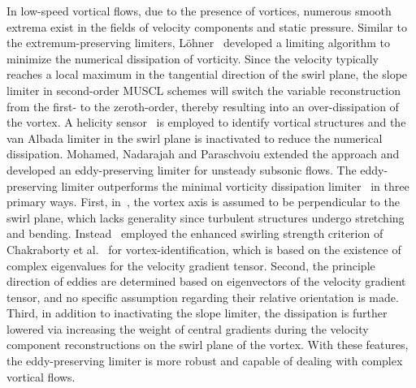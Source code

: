 

In low-speed vortical flows, due to the presence of vortices, numerous smooth extrema exist in the fields of velocity components and static pressure. Similar to the extremum-preserving limiters, L{\"o}hner~\cite{lohner2009limiters} developed a limiting algorithm to minimize the numerical dissipation of vorticity. Since the velocity typically reaches a local maximum in the tangential direction of the swirl plane, the slope limiter in second-order MUSCL schemes will switch the variable reconstruction from the first- to the zeroth-order, thereby resulting into an over-dissipation of the vortex. A helicity sensor~\cite{lohner2009limiters} is employed to identify vortical structures 
and the van Albada limiter in the swirl plane is inactivated to reduce the numerical dissipation. Mohamed, Nadarajah and Paraschvoiu \cite{mohamed2012eddy} extended the approach and developed an eddy-preserving limiter for unsteady subsonic flows. The eddy-preserving limiter outperforms the minimal vorticity dissipation limiter~\cite{lohner2009limiters} in three primary ways. First, in~\cite{lohner2009limiters}, the vortex axis is assumed to be perpendicular to the swirl plane, which lacks generality since turbulent structures undergo stretching and bending. Instead~\cite{mohamed2012eddy} employed the enhanced swirling strength criterion of Chakraborty et al.~\cite{chakraborty2005relationships} for vortex-identification, which is based on the existence of complex eigenvalues for the velocity gradient tensor.  Second, the principle direction of eddies are determined based on eigenvectors of the velocity gradient tensor, and no specific assumption regarding their relative orientation is made. Third, in addition to inactivating the slope limiter, the dissipation is further lowered via increasing the weight of central gradients during the velocity component reconstructions on the swirl plane of the vortex. With these features, the eddy-preserving limiter is more robust and capable of dealing with complex vortical flows. 
